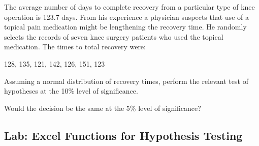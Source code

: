 






\begin{exercise}

The average number of days to complete recovery from a particular type
of knee operation is 123.7 days. From his experience a physician
suspects that use of a topical pain medication might be lengthening the
recovery time. He randomly selects the records of seven knee surgery
patients who used the topical medication. The times to total recovery
were:

128, 135, 121, 142, 126, 151, 123

Assuming a normal distribution of recovery times, perform the relevant
test of hypotheses at the 10\% level of significance.

Would the decision be the same at the 5\% level of significance?

\end{exercise}
\vspace*{8\baselineskip}

\hypertarget{lab-excel-functions-for-hypothesis-testing}{%
\subsection{Lab: Excel Functions for Hypothesis
Testing}\label{lab-excel-functions-for-hypothesis-testing}}

